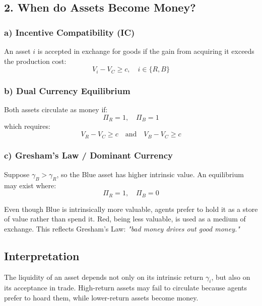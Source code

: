 \documentclass[11pt, a4paper]{article}
\begin{document}
\subsection*{2. When do Assets Become Money?}

\subsubsection*{a) Incentive Compatibility (IC)}

An asset $i$ is accepted in exchange for goods if the gain from acquiring it exceeds the production cost:
\begin{equation}
    V_i - V_C \ge c, \quad i \in \{R,B\}
\end{equation}

\subsubsection*{b) Dual Currency Equilibrium}

Both assets circulate as money if:
\begin{equation}
    \Pi_R = 1, \quad \Pi_B = 1
\end{equation}
which requires:
\begin{equation}
    V_R - V_C \ge c \quad \text{and} \quad V_B - V_C \ge c
\end{equation}

\subsubsection*{c) Gresham's Law / Dominant Currency}

Suppose $\gamma_B > \gamma_R$, so the Blue asset has higher intrinsic value. An equilibrium may exist where:
\[
\Pi_R = 1, \quad \Pi_B = 0
\]

Even though Blue is intrinsically more valuable, agents prefer to hold it as a store of value rather than spend it. Red, being less valuable, is used as a medium of exchange. This reflects Gresham's Law: \textit{"bad money drives out good money."}

\subsection*{Interpretation}

The liquidity of an asset depends not only on its intrinsic return $\gamma_i$, but also on its acceptance in trade. High-return assets may fail to circulate because agents prefer to hoard them, while lower-return assets become money.
\end{document}
